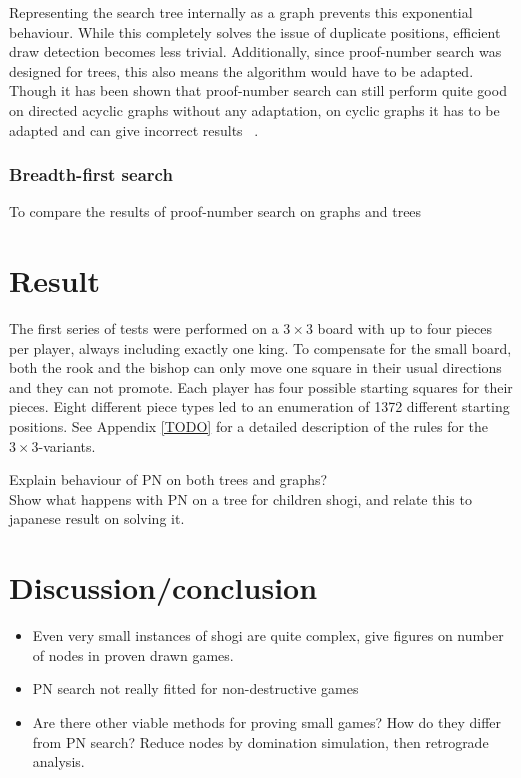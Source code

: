 \documentclass{article}
\begin{document}
Representing the search tree internally as a graph prevents this exponential behaviour. While this completely solves the issue of duplicate
positions, efficient draw detection becomes less trivial. Additionally, since proof-number search was designed for trees, this also means
the algorithm would have to be adapted.
Though it has been shown that proof-number search can still perform quite good on directed acyclic graphs without any adaptation,
on cyclic graphs it has to be adapted and can give incorrect results ~\cite{Schijf93}.\\

\subsubsection*{Breadth-first search}
To compare the results of proof-number search on graphs and trees

\section{Result}
The first series of tests were performed on a $3 \times 3$ board with up to four pieces per player, always including exactly one king. To compensate
for the small board, both the rook and the bishop can only move one square in their usual directions and they can not promote. Each player
has four possible starting squares for their pieces. Eight different piece types led to an enumeration of 1372 different starting positions.
See Appendix \ref{TODO} for a detailed description of the rules for the $3 \times 3$-variants.

Explain behaviour of PN on both trees and graphs?\\

Show what happens with PN on a tree for children shogi, and relate this to japanese result on solving it.

\section{Discussion/conclusion}
\begin{itemize}
	\item Even very small instances of shogi are quite complex, give figures on number of nodes in proven drawn games.
	\item PN search not really fitted for non-destructive games
	\item Are there other viable methods for proving small games? How do they differ from PN search? Reduce nodes by domination simulation, then retrograde analysis.
\end{itemize}

{}

\end{document}
